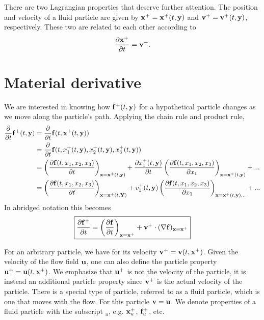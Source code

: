 \documentclass[oneside,a4paper,11pt]{report}
\begin{document}
There are two Lagrangian properties that deserve further attention. The position and velocity of a fluid particle are given by $\mathbf{x}^+ = \mathbf{x}^+(t,\mathbf{y})$ and $\mathbf{v}^+ = \mathbf{v}^+(t,\mathbf{y})$, respectively. These two are related to each other according to 
\begin{equation}
\frac{\partial \mathbf{x}^+}{\partial t} = \mathbf{v}^+.
\end{equation}

\section{Material derivative}

We are interested in knowing how $\mathbf{f}^+(t,\mathbf{y})$ for a hypothetical particle changes as we move along the particle's path. Applying the chain rule and product rule,
\begin{align}
\frac{\partial}{\partial t} \mathbf{f}^+(t,\mathbf{y})&= \frac{\partial}{\partial t} \mathbf{f}(t,\mathbf{x}^+(t,\mathbf{y})) \nonumber \\
&=  \frac{\partial}{\partial t} \mathbf{f}(t,x_1^+(t,\mathbf{y}), x_2^+(t,\mathbf{y}), x_3^+(t,\mathbf{y})) \nonumber \\
&=\left( \frac{\partial \mathbf{f}(t,x_1,x_2,x_3)}{\partial t}\right )_{\mathbf{x}=\mathbf{x}^+(t,\mathbf{y})} + \frac{\partial x_1^+(t,\mathbf{y})}{\partial t} \left ( \frac{\partial \mathbf{f}(t,x_1,x_2,x_3)}{\partial x_1} \right )_{\mathbf{x} = \mathbf{x}^+(t,\mathbf{y})} + ...\nonumber \\
&=\left ( \frac{\partial \mathbf{f}(t,x_1,x_2,x_3)}{\partial t} \right)_{\mathbf{x}=\mathbf{x}^+(t,\mathbf{Y})} + v_1^+(t,\mathbf{y}) \left ( \frac{\partial \mathbf{f}(t,x_1,x_2,x_3)}{\partial x_1} \right )_{\mathbf{x}=\mathbf{x}^+(t,\mathbf{y}),..} + ...
\end{align}
In abridged notation this becomes
\begin{equation}
\label{eq:material_derivative_generic}
\boxed{
\frac{\partial \mathbf{f}^+}{\partial t} = \left ( \frac{\partial \mathbf{f}}{\partial t} \right)_{\mathbf{x}=\mathbf{x}^+} + \mathbf{v}^+ \cdot ( \nabla \mathbf{f})_{\mathbf{x}=\mathbf{x}^+}
}
\end{equation}

For an arbitrary particle, we have for its velocity $\mathbf{v}^+ = \mathbf{v}(t,\mathbf{x}^+)$. Given the velocity of the flow field $\mathbf{u}$, one can also define the particle property $\mathbf{u}^+ = \mathbf{u}(t,\mathbf{x}^+)$. We emphasize that $\mathbf{u}^+$ is not the velocity of the particle, it is instead an additional particle property since $\mathbf{v}^+$ is the actual velocity of the particle. There is a special type of particle, referred to as a fluid particle, which is one that moves with the flow. For this particle $\mathbf{v} = \mathbf{u}$. We denote properties of a fluid particle with the subscript $_u$, e.g. $\mathbf{x}^+_u$, $\mathbf{f}^+_u$, etc.
\end{document}
